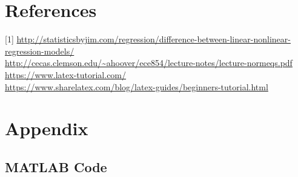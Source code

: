 \documentclass[12pt]{article}
\begin{document}
\section*{References}
[1] \quad\url{http://statisticsbyjim.com/regression/difference-between-linear-nonlinear-regression-models/} \\

\noindent
[2] \quad\url{http://cecas.clemson.edu/~ahoover/ece854/lecture-notes/lecture-normeqs.pdf} \\

\noindent
[3] \quad\url{https://www.latex-tutorial.com/} \\

\noindent
[4] \quad\url{https://www.sharelatex.com/blog/latex-guides/beginners-tutorial.html} \\




\section{Appendix}

\subsection{MATLAB Code}

%
\end{document}
